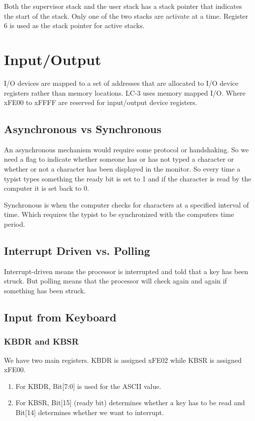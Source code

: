 Both the supervisor stack and the user stack has a stack pointer that indicates the start of the stack. Only one of the two stacks are activate at a time. Register 6 is used as the stack pointer for active stacks. 


\section{Input/Output}

I/O devices are mapped to a set of addresses that are allocated to I/O device registers rather than memory locations. LC-3 uses memory mapped I/O. Where xFE00 to  xFFFF are reserved for input/output device registers.


\subsection{Asynchronous vs Synchronous}
An asynchronous mechanism would require some protocol or handshaking. So we need a flag to indicate whether someone has or has not typed a character or whether or not a character has been  displayed in the monitor. So every time a typist types something the ready bit is set to 1 and if the character is read by the computer it is set back to 0.

Synchronous is when the computer checks for characters at a specified interval of time. Which requires the typist to be synchronized with the computers time period.


\subsection{Interrupt Driven vs. Polling}
Interrupt-driven means the processor is interrupted and told that a key has been struck.  But polling means that the processor will check again and again if something has been struck.

\subsection{Input from Keyboard}
\subsubsection{KBDR and KBSR}
We have two main registers. KBDR is assigned xFE02 while KBSR is assigned xFE00. 

\begin{enumerate}
    \item  For KBDR, Bit[7:0] is used for the ASCII value. 
\item  For KBSR, Bit[15] (ready bit) determines whether a key has to be read and Bit[14] determines whether we want to interrupt.
\end{enumerate}


